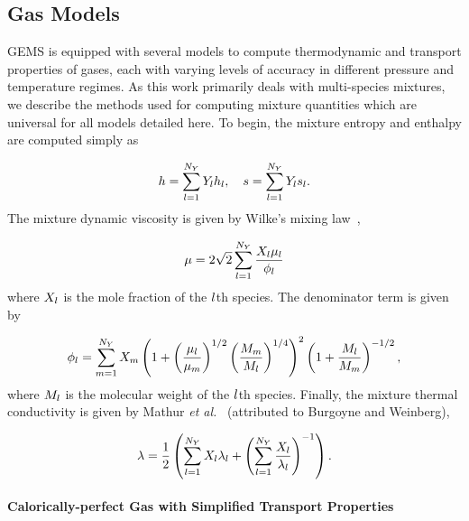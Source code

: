 \subsection{Gas Models}\label{subsec:gasModels}

GEMS is equipped with several models to compute thermodynamic and transport properties of gases, each with varying levels of accuracy in different pressure and temperature regimes. As this work primarily deals with multi-species mixtures, we describe the methods used for computing mixture quantities which are universal for all models detailed here. To begin, the mixture entropy and enthalpy are computed simply as

\begin{equation}
	h = \sum_{l = 1}^{N_Y} Y_{l} h_{l}, \quad s = \sum_{l = 1}^{N_Y} Y_{l} s_{l}.
\end{equation}
The mixture dynamic viscosity is given by Wilke's mixing law~\cite{Wilke1950},

\begin{equation}\label{eq:viscMix}
	\mu = 2 \sqrt{2} \sum_{l = 1}^{N_Y} \frac{X_{l} \mu_{l}}{\phi_{l}}
\end{equation}
where $X_{l}$ is the mole fraction of the $l$th species. The denominator term is given by

\begin{equation}\label{eq:viscMixDenom}
	\phi_{l} = \sum_{m = 1}^{N_Y} X_{m} \left( 1 + \left( \frac{\mu_{l}}{\mu_{m}} \right)^{1/2} \left( \frac{M_{m}}{M_{l}} \right)^{1/4} \right)^2 \left( 1 + \frac{M_{l}}{M_{m}} \right)^{-1/2},
\end{equation}
where $M_{l}$ is the molecular weight of the $l$th species. Finally, the mixture thermal conductivity is given by Mathur \textit{et al.}~\cite{Mathur1967} (attributed to Burgoyne and Weinberg),

\begin{equation}\label{eq:thermCondMix}
    \lambda = \frac{1}{2} \left( \sum_{l = 1}^{N_Y} X_{l} \lambda_{l} + \left(\sum_{l = 1}^{N_Y} \frac{X_{l}}{\lambda_{l}} \right)^{-1} \right).
\end{equation}


\paragraph*{Calorically-perfect Gas with Simplified Transport Properties}\mbox{}\\

